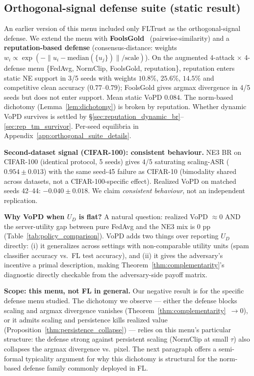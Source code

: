 \documentclass{article}
\begin{document}
\subsection{Orthogonal-signal defense suite (static result)}
\label{sec:orthogonal_defense_suite}

An earlier version of this menu included only FLTrust as the orthogonal-signal defense. We extend the menu with \textbf{FoolsGold}~\citep{fung2018foolsgold} (pairwise-similarity) and a \textbf{reputation-based defense} (consensus-distance: weights $w_i \propto \exp(-\|u_i - \mathrm{median}(\{u_j\})\|/\text{scale})$). On the augmented 4-attack $\times$ 4-defense menu \{FedAvg, NormClip, FoolsGold, reputation\}, reputation enters static NE support in 3/5 seeds with weights $10.8\%$, $25.6\%$, $14.5\%$ and competitive clean accuracy ($0.77$--$0.79$); FoolsGold gives argmax divergence in 4/5 seeds but does not enter support. Mean static VoPD $0.084$. The norm-based dichotomy (Lemma~\ref{lem:dichotomy}) is broken by reputation. Whether dynamic VoPD survives is settled by §\ref{sec:reputation_dynamic_br}--\ref{sec:rep_tm_survivor}. Per-seed equilibria in Appendix~\ref{app:orthogonal_suite_details}.

\textbf{Second-dataset signal (CIFAR-100): consistent behaviour.}\label{sec:cifar100_replication} NE3 BR on CIFAR-100 (identical protocol, 5 seeds) gives 4/5 saturating scaling-ASR ($0.954 \pm 0.013$) with the same seed-45 failure as CIFAR-10 (bimodality shared across datasets, not a CIFAR-100-specific effect). Realized VoPD on matched seeds 42--44: $-0.040 \pm 0.018$. We claim \emph{consistent behaviour}, not an independent replication.

\textbf{Why VoPD when $U_D$ is flat?} A natural question: realized VoPD $\approx 0$ AND the server-utility gap between pure FedAvg and the NE3 mix is $0$ pp (Table~\ref{tab:policy_comparison}). VoPD adds two things over reporting $U_D$ directly: (i) it generalizes across settings with non-comparable utility units (spam classifier accuracy vs.\ FL test accuracy), and (ii) it gives the adversary's incentive a primal description, making Theorem~\ref{thm:complementarity}'s diagnostic directly checkable from the adversary-side payoff matrix.

\textbf{Scope: this menu, not FL in general.} Our negative result is for the specific defense menu studied. The dichotomy we observe --- either the defense blocks scaling and argmax divergence vanishes (Theorem~\ref{thm:complementarity}~$\to 0$), or it admits scaling and persistence kills realized value (Proposition~\ref{thm:persistence_collapse}) --- relies on this menu's particular structure: the defense strong against persistent scaling (NormClip at small $\tau$) also collapses the argmax divergence vs.\ pixel. The next paragraph offers a semi-formal typicality argument for why this dichotomy is structural for the norm-based defense family commonly deployed in FL.
\end{document}
